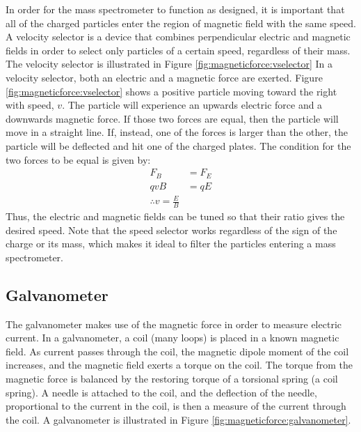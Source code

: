 In order for the mass spectrometer to function as designed, it is important that all of the charged particles enter the region of magnetic field with the same speed. A velocity selector is a device that combines perpendicular electric and magnetic fields in order to select only particles of a certain speed, regardless of their mass. The velocity selector is illustrated in Figure \ref{fig:magneticforce:vselector}
In a velocity selector, both an electric and a magnetic force are exerted. Figure \ref{fig:magneticforce:vselector} shows a positive particle moving toward the right with speed, $v$. The particle will experience an upwards electric force and a downwards magnetic force. If those two forces are equal, then the particle will move in a straight line. If, instead, one of the forces is larger than the other, the particle will be deflected and hit one of the charged plates. The condition for the two forces to be equal is given by:
\begin{align*}
F_B &= F_E\\
qvB &= qE\\
\therefore v=\frac{E}{B}
\end{align*}
Thus, the electric and magnetic fields can be tuned so that their ratio gives the desired speed. Note that the speed selector works regardless of the sign of the charge or its mass, which makes it ideal to filter the particles entering a mass spectrometer.
\subsection{Galvanometer}
The galvanometer makes use of the magnetic force in order to measure electric current. In a galvanometer, a coil (many loops) is placed in a known magnetic field. As current passes through the coil, the magnetic dipole moment of the coil increases, and the magnetic field exerts a torque on the coil. The torque from the magnetic force is balanced by the restoring torque of a torsional spring (a coil spring). A needle is attached to the coil, and the deflection of the needle, proportional to the current in the coil, is then a measure of the current through the coil. A galvanometer is illustrated in Figure \ref{fig:magneticforce:galvanometer}.
